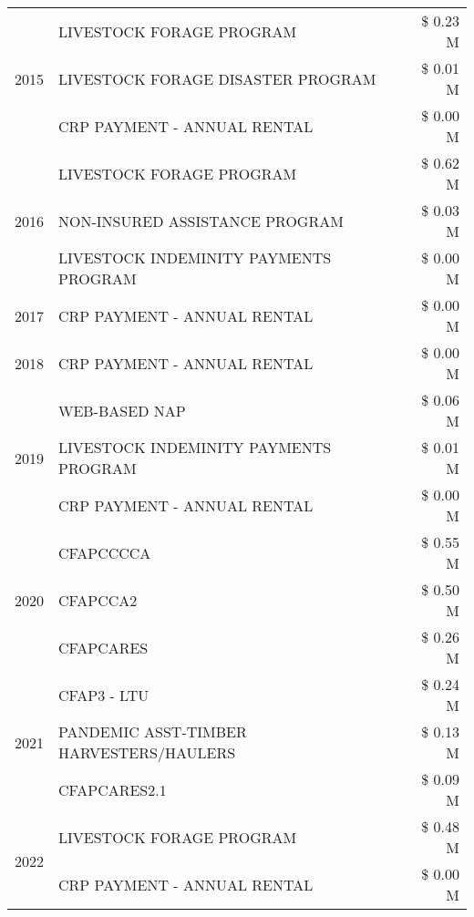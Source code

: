 \begin{tabular}{llr}
\cline{1-3}
\multirow[t]{3}{*}{2015} & LIVESTOCK FORAGE PROGRAM & \$ 0.23 M \\
 & LIVESTOCK FORAGE DISASTER PROGRAM & \$ 0.01 M \\
 & CRP PAYMENT - ANNUAL RENTAL & \$ 0.00 M \\
\cline{1-3}
\multirow[t]{3}{*}{2016} & LIVESTOCK FORAGE PROGRAM & \$ 0.62 M \\
 & NON-INSURED ASSISTANCE PROGRAM & \$ 0.03 M \\
 & LIVESTOCK INDEMINITY PAYMENTS PROGRAM & \$ 0.00 M \\
\cline{1-3}
2017 & CRP PAYMENT - ANNUAL RENTAL & \$ 0.00 M \\
\cline{1-3}
2018 & CRP PAYMENT - ANNUAL RENTAL & \$ 0.00 M \\
\cline{1-3}
\multirow[t]{3}{*}{2019} & WEB-BASED NAP & \$ 0.06 M \\
 & LIVESTOCK INDEMINITY PAYMENTS PROGRAM & \$ 0.01 M \\
 & CRP PAYMENT - ANNUAL RENTAL & \$ 0.00 M \\
\cline{1-3}
\multirow[t]{3}{*}{2020} & CFAPCCCCA & \$ 0.55 M \\
 & CFAPCCA2 & \$ 0.50 M \\
 & CFAPCARES & \$ 0.26 M \\
\cline{1-3}
\multirow[t]{3}{*}{2021} & CFAP3 - LTU & \$ 0.24 M \\
 & PANDEMIC ASST-TIMBER HARVESTERS/HAULERS & \$ 0.13 M \\
 & CFAPCARES2.1 & \$ 0.09 M \\
\cline{1-3}
\multirow[t]{2}{*}{2022} & LIVESTOCK FORAGE PROGRAM & \$ 0.48 M \\
 & CRP PAYMENT - ANNUAL RENTAL & \$ 0.00 M \\
\cline{1-3}
\bottomrule
\end{tabular}
